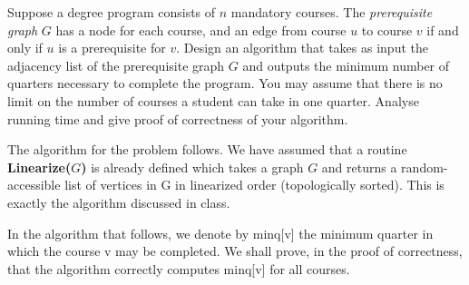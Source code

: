 \documentclass[answers]{exam}
\begin{document}
\begin{questions}

\vspace{0.3in}


\question[20] Suppose a degree program consists of $n$ mandatory courses.
The {\em prerequisite graph} $G$ has a node for each course, and an edge from course $u$ to course $v$ if and only if $u$ is a prerequisite for $v$. Design an algorithm that takes as input the adjacency list of the prerequisite graph $G$ and outputs the minimum number of quarters necessary to complete the program. You may assume that there is no limit on the number of courses a student can take in one quarter. 
Analyse running time and give proof of correctness of your algorithm.

\begin{solution}
The algorithm for the problem follows. We have assumed that a routine \textbf{Linearize($G$)} is already defined which takes a graph $G$ and returns a random-accessible list of vertices in G in linearized order (topologically sorted). This is exactly the algorithm discussed in class.

In the algorithm that follows, we denote by minq[v] the minimum quarter in which the course v may be completed. We shall prove, in the proof of correctness, that the algorithm correctly computes minq[v] for all courses.


\end{solution}
\end{questions}
\end{document}
